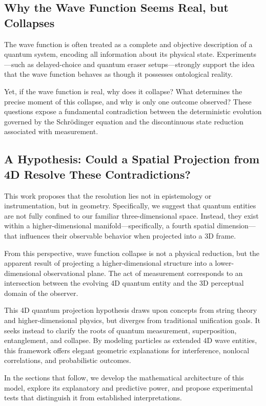 \documentclass[12pt]{article}
\begin{document}
\subsection{Why the Wave Function Seems Real, but Collapses}

The wave function is often treated as a complete and objective description of a quantum system, encoding all information about its physical state. Experiments—such as delayed-choice and quantum eraser setups—strongly support the idea that the wave function behaves as though it possesses ontological reality.

Yet, if the wave function is real, why does it collapse? What determines the precise moment of this collapse, and why is only one outcome observed? These questions expose a fundamental contradiction between the deterministic evolution governed by the Schrödinger equation and the discontinuous state reduction associated with measurement.

\subsection{A Hypothesis: Could a Spatial Projection from 4D Resolve These Contradictions?}

This work proposes that the resolution lies not in epistemology or instrumentation, but in geometry. Specifically, we suggest that quantum entities are not fully confined to our familiar three-dimensional space. Instead, they exist within a higher-dimensional manifold—specifically, a fourth spatial dimension—that influences their observable behavior when projected into a 3D frame.

From this perspective, wave function collapse is not a physical reduction, but the apparent result of projecting a higher-dimensional structure into a lower-dimensional observational plane. The act of measurement corresponds to an intersection between the evolving 4D quantum entity and the 3D perceptual domain of the observer.

This 4D quantum projection hypothesis draws upon concepts from string theory and higher-dimensional physics, but diverges from traditional unification goals. It seeks instead to clarify the roots of quantum measurement, superposition, entanglement, and collapse. By modeling particles as extended 4D wave entities, this framework offers elegant geometric explanations for interference, nonlocal correlations, and probabilistic outcomes.

In the sections that follow, we develop the mathematical architecture of this model, explore its explanatory and predictive power, and propose experimental tests that distinguish it from established interpretations.
\end{document}
